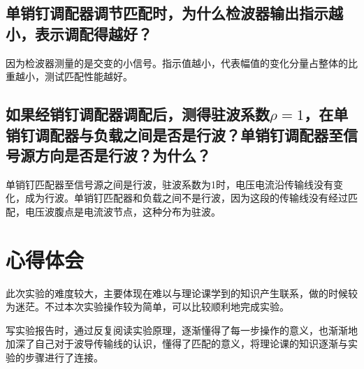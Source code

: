 \documentclass{../source/zjureport}
\begin{document}
        \subsection{单销钉调配器调节匹配时，为什么检波器输出指示越小，表示调配得越好？}

        因为检波器测量的是交变的小信号。指示值越小，代表幅值的变化分量占整体的比重越小，测试匹配性能越好。

        \subsection{如果经销钉调配器调配后，测得驻波系数$\rho = 1$，在单销钉调配器与负载之间是否是行波？单销钉调配器至信号源方向是否是行波？为什么？}
        单销钉匹配器至信号源之间是行波，驻波系数为1时，电压电流沿传输线没有变化，成为行波。单销钉匹配器和负载之间不是行波，因为这段的传输线没有经过匹配，电压波腹点是电流波节点，这种分布为驻波。

    \section{心得体会}
    此次实验的难度较大，主要体现在难以与理论课学到的知识产生联系，做的时候较为迷茫。不过本次实验操作较为简单，可以比较顺利地完成实验。

    写实验报告时，通过反复阅读实验原理，逐渐懂得了每一步操作的意义，也渐渐地加深了自己对于波导传输线的认识，懂得了匹配的意义，将理论课的知识逐渐与实验的步骤进行了连接。
\end{document}
